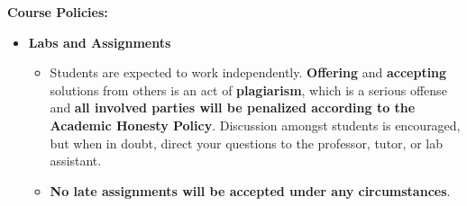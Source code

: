 \documentclass[11pt]{article}
\begin{document}
\textbf {\large Course Policies:}
\begin{itemize}
\item \textbf {Labs and Assignments}
  \begin{itemize}
  \item Students are expected to work independently. \textbf{Offering}
    and \textbf{accepting} solutions from others is an act of
    \textbf{plagiarism}, which is a serious offense and \textbf{all
      involved parties will be penalized according to the Academic
      Honesty Policy}. Discussion amongst students is encouraged, but
    when in doubt, direct your questions to the professor, tutor, or
    lab assistant.
  \item \textbf{No late assignments will be accepted under any circumstances}.
  \end{itemize}
\end{itemize}
\end{document}
